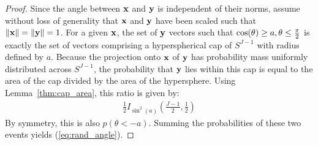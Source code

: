 \documentclass[]{article}
\newtheorem{lemma}{Lemma}[section]
\begin{document}
\begin{proof} Since the angle between $\mathbf{x}$ and $\mathbf{y}$ is independent of their norms, assume without loss of generality that $\mathbf{x}$ and $\mathbf{y}$ have been scaled such that $\lVert\mathbf{x}\rVert = \lVert\mathbf{y}\rVert = 1$. %
For a given $\mathbf{x}$, the set of $\mathbf{y}$ vectors such that $\cos(\theta) \ge a, \theta \le \frac{\pi}{2}$ is exactly the set of vectors comprising a hyperspherical cap of $S^{J-1}$ with radius defined by $a$.
Because the projection onto $\mathbf{x}$ of $\mathbf{y}$ has probability mass uniformly distributed across $S^{J-1}$, the probability that $\mathbf{y}$ lies within this cap is equal to the area of the cap divided by the area of the hypersphere. Using Lemma~\ref{thm:cap_area}, this ratio is given by:
\begin{align} \label{eq:beta_survival}
    \frac{1}{2} I_{\sin^2(a)} \left( \frac{J-1}{2}, \frac{1}{2} \right)
\end{align}
By symmetry, this is also $p(\theta < -a)$. Summing the probabilities of these two events yields (\ref{eq:rand_angle}).

%
\end{proof}



\end{document}
